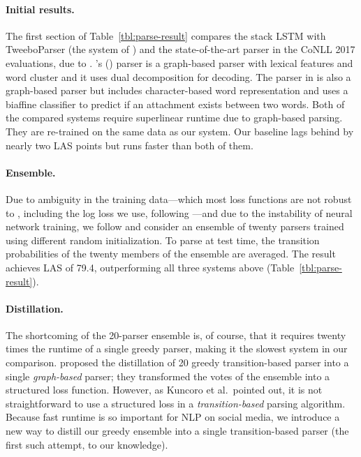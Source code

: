 \documentclass[11pt,a4paper]{article}
\newcommand{\Citeposs}[2][]{\Citeauthor{#2}'s (\citeyear[#1]{#2})}
\begin{document}
\paragraph{Initial results.}  The first section of Table~\ref{tbl:parse-result} compares
the stack LSTM with {\sc TweeboParser} (the system 
of \citealp{kong-EtAl:2014:EMNLP2014}) and the state-of-the-art parser
in the CoNLL 2017 evaluations, due to
 \citet{dozat-qi-manning:2017:K17-3}.
 \Citeposs{kong-EtAl:2014:EMNLP2014} parser is a graph-based
parser with lexical features and word cluster and it uses dual decomposition
for decoding. The parser in \citet{dozat-qi-manning:2017:K17-3} is also a graph-based parser
but includes character-based word representation and uses a biaffine classifier
to predict if an attachment exists between two words.
Both of the compared systems require superlinear runtime due to graph-based parsing. 
They are re-trained on the same data as our
system.
Our baseline lags behind by nearly two LAS
points but runs faster than both of them.

\paragraph{Ensemble.}  Due to ambiguity in the training
data---which most loss functions are not robust to \citep{Frnay2014ClassificationIT}, including the log loss we use, following
\citet{ballesteros-dyer-smith:2015:EMNLP}---and due to the instability
of neural network training, we follow \citet{Dietterich2000} and
consider an ensemble of twenty parsers trained using different random
initialization.  To parse at test time, the transition probabilities of the twenty
members of the ensemble are averaged.  The result achieves LAS of
79.4, outperforming all three systems above (Table~\ref{tbl:parse-result}).

\paragraph{Distillation.}  The shortcoming of the 20-parser ensemble is, of
course, that it requires twenty times the runtime of a single greedy
parser, making it the slowest system in our comparison.   proposed the distillation of 20
greedy transition-based parser into a single \emph{graph-based}
parser; they transformed the votes of the ensemble into a structured
loss function.  However, as Kuncoro et al.~pointed out, 
it is not straightforward to use a structured
loss in a \emph{transition-based} parsing algorithm.  Because fast
runtime is so important for NLP on social media, we
introduce a new way to distill our greedy ensemble into a single
transition-based parser (the first such attempt, to our knowledge).  
\end{document}
